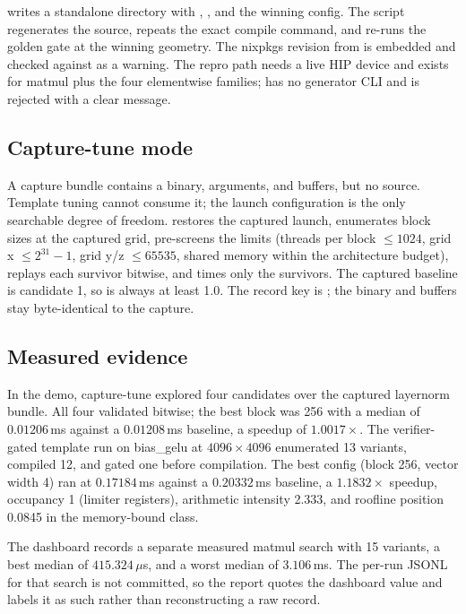  writes a standalone directory with ,
, and the winning config. The script regenerates the source,
repeats the exact compile command, and re-runs the golden gate at the winning
geometry. The nixpkgs revision from  is embedded and checked
against  as a warning. The repro path needs
a live HIP device and exists for matmul plus the four elementwise families;
 has no generator CLI and is rejected with a clear
message.

\subsection{Capture-tune mode}
\label{sec:c2-capture}

A capture bundle contains a binary, arguments, and buffers, but no source.
Template tuning cannot consume it; the launch configuration is the only
searchable degree of freedom.  restores the
captured launch, enumerates block sizes at the captured grid, pre-screens the
limits (threads per block $\le 1024$, grid x $\le 2^{31}-1$, grid y/z
$\le 65535$, shared memory within the architecture budget), replays each
survivor bitwise, and times only the survivors. The captured baseline is
candidate 1, so  is always at least 1.0. The record key is
; the binary and
buffers stay byte-identical to the capture.

\subsection{Measured evidence}
\label{sec:c2-evidence}

In the demo, capture-tune explored four candidates over the captured
layernorm bundle. All four validated bitwise; the best block was 256 with a
median of $0.01206$\,ms against a $0.01208$\,ms baseline, a speedup of
$1.0017\times$. The verifier-gated template run on bias\_gelu at
$4096 \times 4096$ enumerated 13 variants, compiled 12, and gated one before
compilation. The best config (block 256, vector width 4) ran at
$0.17184$\,ms against a $0.20332$\,ms baseline, a $1.1832\times$ speedup,
occupancy 1 (limiter registers), arithmetic intensity 2.333, and roofline
position 0.0845 in the memory-bound class.

The dashboard records a separate measured matmul search with 15 variants, a
best median of $415.324\,\mu$s, and a worst median of $3.106$\,ms. The
per-run JSONL for that search is not committed, so the report quotes the
dashboard value and labels it as such rather than reconstructing a raw record.

